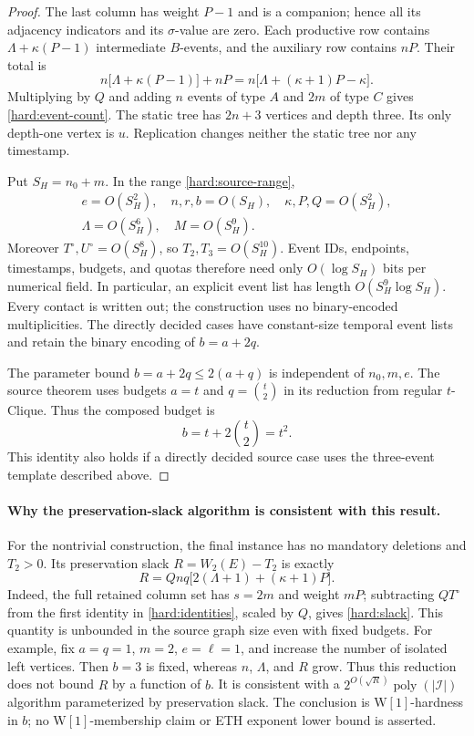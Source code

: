 \begin{proof}
The last column has weight \(P-1\) and is a companion; hence all its
adjacency indicators and its \(\sigma\)-value are zero. Each productive
row contains \(\Lambda+\kappa(P-1)\) intermediate \(B\)-events, and the
auxiliary row contains \(nP\). Their total is
\[
 n\bigl[\Lambda+\kappa(P-1)\bigr]+nP
   =n\bigl[\Lambda+(\kappa+1)P-\kappa\bigr].
\]
Multiplying by \(Q\) and adding \(n\) events of type \(A\) and \(2m\)
of type \(C\) gives \eqref{hard:event-count}.
The static tree has \(2n+3\) vertices and depth three. Its only
depth-one vertex is \(u\). Replication changes neither the static tree
nor any timestamp.

Put \(S_H=n_0+m\). In the range \eqref{hard:source-range},
\[
\begin{gathered}
 e=O(S_H^2),\quad n,r,b=O(S_H),\quad
 \kappa,P,Q=O(S_H^2),\\
 \Lambda=O(S_H^6),\quad M=O(S_H^9).
\end{gathered}
\]
Moreover \(T^\circ,U^\circ=O(S_H^8)\), so \(T_2,T_3=O(S_H^{10})\).
Event IDs, endpoints, timestamps, budgets, and quotas therefore need
only \(O(\log S_H)\) bits per numerical field. In particular, an explicit
event list has length \(O(S_H^9\log S_H)\). Every contact is written out;
the construction uses no binary-encoded multiplicities.
The directly decided cases have constant-size temporal event lists and
retain the binary encoding of \(b=a+2q\).

The parameter bound \(b=a+2q\le2(a+q)\) is independent of \(n_0,m,e\).
The source theorem uses budgets
\(a=t\) and \(q=\binom{t}{2}\) in its reduction from regular
\(t\)-Clique. Thus the composed budget is
\[
 b=t+2\binom{t}{2}=t^2.
\]
This identity also holds if a directly decided source case uses the
three-event template described above.
\end{proof}

\paragraph{Why the preservation-slack algorithm is consistent with this result.}
For the nontrivial construction, the final instance has no mandatory
deletions and \(T_2>0\).
Its preservation slack \(R=W_2(E)-T_2\) is exactly
\begin{equation}
\label{hard:slack}
 R=Qnq\bigl[2(\Lambda+1)+(\kappa+1)P\bigr].
\end{equation}
Indeed, the full retained column set has \(s=2m\) and weight \(mP\);
subtracting \(QT^\circ\) from the first identity in
\eqref{hard:identities}, scaled by \(Q\), gives \eqref{hard:slack}.
This quantity is unbounded in the source graph size even with fixed
budgets. For example, fix \(a=q=1\), \(m=2\), \(e=\ell=1\), and increase
the number of isolated left vertices. Then \(b=3\) is fixed, whereas
\(n\), \(\Lambda\), and \(R\) grow.
Thus this reduction does not bound \(R\) by a function of \(b\).
It is consistent with a \(2^{O(\sqrt R)}\operatorname{poly}(|\mathcal I|)\)
algorithm parameterized by preservation slack. The conclusion is
\(\mathrm{W}[1]\)-hardness in \(b\); no \(\mathrm{W}[1]\)-membership claim
or ETH exponent lower bound is asserted.

